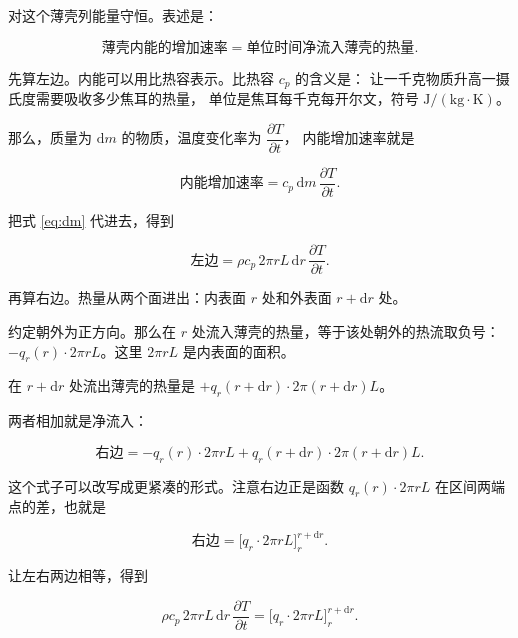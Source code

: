 对这个薄壳列能量守恒。表述是：

\begin{equation}
\text{薄壳内能的增加速率} = \text{单位时间净流入薄壳的热量}.
\end{equation}

先算左边。内能可以用比热容表示。比热容 $c_p$ 的含义是：
让一千克物质升高一摄氏度需要吸收多少焦耳的热量，
单位是焦耳每千克每开尔文，符号 $\mathrm{J/(kg\cdot K)}$。

那么，质量为 $\mathrm{d}m$ 的物质，温度变化率为 $\dfrac{\partial T}{\partial t}$，
内能增加速率就是

\begin{equation}
\text{内能增加速率} = c_p\,\mathrm{d}m\,\frac{\partial T}{\partial t}.
\label{eq:lhs}
\end{equation}

把式 \eqref{eq:dm} 代进去，得到

\begin{equation}
\text{左边} = \rho c_p\,2\pi r L\,\mathrm{d}r\,\frac{\partial T}{\partial t}.
\label{eq:lhs2}
\end{equation}

再算右边。热量从两个面进出：内表面 $r$ 处和外表面 $r+\mathrm{d}r$ 处。

约定朝外为正方向。那么在 $r$ 处流入薄壳的热量，等于该处朝外的热流取负号：
$-q_r(r)\cdot 2\pi r L$。这里 $2\pi r L$ 是内表面的面积。

在 $r+\mathrm{d}r$ 处流出薄壳的热量是 $+q_r(r+\mathrm{d}r)\cdot 2\pi(r+\mathrm{d}r)L$。

两者相加就是净流入：

\begin{equation}
\text{右边} = -q_r(r)\cdot 2\pi r L + q_r(r+\mathrm{d}r)\cdot 2\pi(r+\mathrm{d}r)L .
\label{eq:rhs}
\end{equation}

这个式子可以改写成更紧凑的形式。注意右边正是函数 $q_r(r)\cdot 2\pi r L$
在区间两端点的差，也就是

\begin{equation}
\text{右边} = \Big[q_r\cdot 2\pi r L\Big]_{r}^{r+\mathrm{d}r}.
\label{eq:rhs2}
\end{equation}

让左右两边相等，得到

\begin{equation}
\rho c_p\,2\pi r L\,\mathrm{d}r\,\frac{\partial T}{\partial t}
= \Big[q_r\cdot 2\pi r L\Big]_{r}^{r+\mathrm{d}r}.
\label{eq:balance1}
\end{equation}

